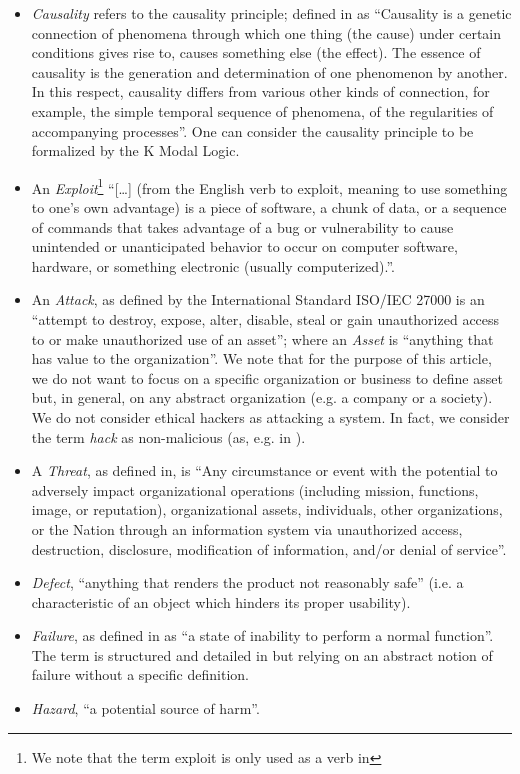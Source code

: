 \documentclass[conference]{IEEEtran}
\begin{document}
\begin{itemize}
	\item \emph{Causality} refers to the causality principle; defined
		in\cite{Spirkin1983Dialectical} as ``Causality is a genetic
		connection of phenomena through which one thing (the cause)
		under certain conditions gives rise to, causes something else
		(the effect). The essence of causality is the generation and
		determination of one phenomenon by another. In this respect,
		causality differs from various other kinds of connection, for
		example, the simple temporal sequence of phenomena, of the
		regularities of accompanying processes''. One can consider the
		causality principle to be formalized by the K Modal Logic.
	\item An \emph{Exploit}\footnote{We note that the term exploit is only
		used as a verb in\cite{ISO2009information}} ``[\ldots]
		(from the English verb to exploit, meaning to use something to
		one’s own advantage) is a piece of software, a chunk of data,
		or a sequence of commands that takes advantage of a bug or
		vulnerability to cause unintended or unanticipated behavior to
		occur on computer software, hardware, or something electronic
		(usually computerized).''\cite{wiki-exploit}.
	\item An \emph{Attack}, as defined by the International Standard
		ISO/IEC 27000 is an ``attempt to destroy, expose, alter,
		disable, steal or gain unauthorized access to or make
		unauthorized use of an asset''; where an \emph{Asset} is
		``anything that has value to the organization''. We note that for
		the purpose of this article, we do not want to focus on a specific
		organization or business to define asset but, in general, on any 
		abstract organization (e.g. a company or a society).
		We do not consider ethical hackers as attacking a system. 
		In fact, we consider the term \emph{hack} as
		non-malicious (as, e.g. in \cite{Stallman2002hacker}).
	\item A \emph{Threat}, as defined in\cite{cnssi20104009}, is ``Any
		circumstance or event with the potential to adversely impact
		organizational operations (including mission, functions, image,
		or reputation), organizational assets, individuals, other
		organizations, or the Nation through an information system via
		unauthorized access, destruction, disclosure, modification of
		information, and/or denial of service''.
	\item \emph{Defect}, ``anything that renders the product not reasonably
		safe''\cite{Robinson2019writing} (i.e. a characteristic of
		an object which hinders its proper usability).
	\item \emph{Failure}, as defined in\cite{Merriam2020failure} as ``a state of
		inability to perform a normal function''. The term is
		structured and detailed in
		\cite{cnssi20104009,iet2017glossary} but relying on an
		abstract notion of failure without a specific definition.
	\item \emph{Hazard}, ``a potential source of
		harm''\cite{iet2017glossary}.
\end{itemize}
\end{document}
